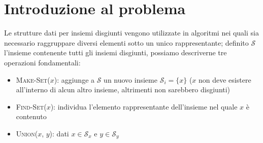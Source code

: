 \section{Introduzione al problema}

Le strutture dati per insiemi disgiunti vengono utilizzate in algoritmi
nei quali sia necessario raggruppare diversi elementi sotto un unico rappresentante;
definito $\mathcal{S}$ l'insieme contenente tutti gli insiemi disgiunti,
possiamo descriverne tre operazioni fondamentali:


\begin{itemize}
    \item \textsc{Make-Set($x$)}: aggiunge a $\mathcal{S}$ un nuovo insieme
          $\mathcal{S}_i = \{x\}$ ($x$ non deve esistere all'interno di alcun altro insieme,
          altrimenti non sarebbero disgiunti)
    \item \textsc{Find-Set($x$)}: individua l'elemento rappresentante dell'insieme nel quale $x$ è contenuto
    \item \textsc{Union($x$, $y$)}: dati $x \in \mathcal{S}_x$ e $y \in \mathcal{S}_y$  
\end{itemize}